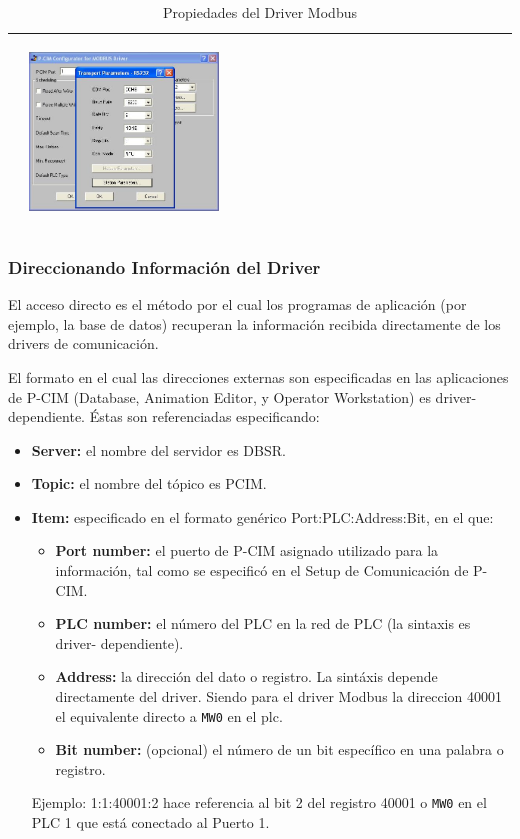 \begin{table}[H]
\begin{tabular}{*{2}{m{}}}
  &\begin{center}
        \includegraphics[width=0.4\textwidth]
      {Cap5-SCADA/images/modbusDriver2.jpeg}
  \end{center}\\
\hline
\end{tabular}
\caption{Propiedades del Driver Modbus}
\label{tab:PropModbus}
\end{table}

\subsubsection{Direccionando Información del Driver}
\label{subsubsec:InforDriver}
El acceso directo es el método por el cual los programas de aplicación (por
ejemplo, la base de datos) recuperan la información recibida directamente de 
los drivers de comunicación.

El formato en el cual las direcciones externas son especificadas en las
aplicaciones de P-CIM (Database, Animation Editor, y Operator
Workstation) es driver-dependiente. Éstas son referenciadas especificando:
\begin{itemize}
 \item \textbf{Server:} el nombre del servidor es DBSR.
 \item \textbf{Topic:} el nombre del tópico es PCIM.
 \item \textbf{Item:} especificado en el formato genérico Port:PLC:Address:Bit,
en
  el que:
  \begin{itemize}
   \item \textbf{Port number:} el puerto de P-CIM asignado utilizado para la
    información, 
    tal como se especificó en el Setup de Comunicación de P-CIM.
   \item \textbf{PLC number:} el número del PLC en la red de PLC (la sintaxis
es driver-
    dependiente).
    \item \textbf{Address:} la dirección del dato o registro. La sintáxis
depende 
    directamente del driver. Siendo para el driver Modbus la direccion 40001 el 
    equivalente directo a \verb|MW0| en el \gls{plc}.
    \item \textbf{Bit number:} (opcional) el número de un bit específico en una
palabra o registro.
  \end{itemize}
  Ejemplo: 1:1:40001:2 hace referencia al bit 2 del registro 40001 o \verb|MW0|
en el PLC 1 que está conectado al Puerto 1.
\end{itemize}

